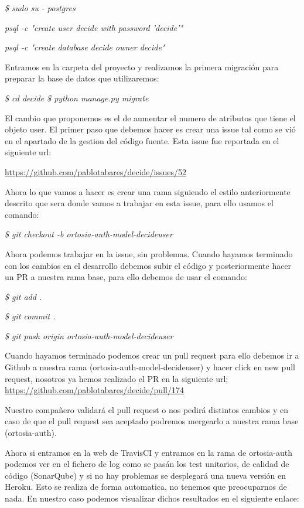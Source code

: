 \documentclass[12pt]{article}
\begin{document}
\emph{\$ sudo su - postgres}

\emph{psql -c "create user decide with password 'decide'"}

\emph{psql -c "create database decide owner decide"
}

Entramos en la carpeta del proyecto y realizamos la primera migración para preparar la base de datos que utilizaremos:

\emph{\$ cd decide
\$ python manage.py migrate
}

El cambio que proponemos es el de aumentar el numero de atributos que tiene el objeto user. El primer paso que debemos hacer es crear una issue tal como se vió en el apartado de la gestion del código fuente. Esta issue fue reportada en el siguiente url:

\url{https://github.com/pablotabares/decide/issues/52}

Ahora lo que vamos a hacer es crear una rama siguiendo el estilo anteriormente descrito que sera donde vamos a trabajar en esta issue, para ello usamos el comando:

\emph{\$ git checkout -b ortosia-auth-model-decideuser}


Ahora podemos trabajar en la issue, sin problemas. 
Cuando hayamos terminado con los cambios en el desarrollo debemos subir el código y posteriormente hacer un PR a nuestra rama base, para ello debemos de usar el comando:

\emph{\$ git add .}

\emph{\$ git commit .}

\emph{\$ git push origin ortosia-auth-model-decideuser}

Cuando hayamos terminado podemos crear un pull request para ello debemos ir a Github a nuestra rama (ortosia-auth-model-decideuser) y hacer click en new pull request, nosotros ya hemos realizado el PR en la siguiente url; \url{https://github.com/pablotabares/decide/pull/174}

Nuestro compañero validará el pull request o nos pedirá distintos cambios y en caso de que el pull request sea aceptado podremos mergearlo a nuestra rama base (ortosia-auth). 

Ahora si entramos en la web de TravisCI y entramos en la rama de ortosia-auth podemos ver en el fichero de log como se pasán los test unitarios, de calidad de código (SonarQube) y si no hay problemas se desplegará una nueva versión en Heroku. Esto se realiza de forma automatica, no tenemos que preocuparnos de nada. En nuestro caso podemos visualizar dichos resultados en el siguiente enlace:
\end{document}
